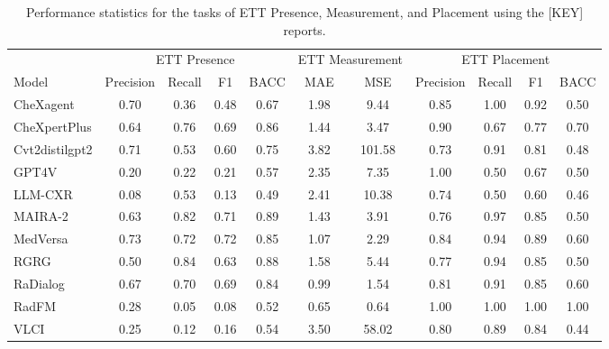 
    \begin{table*}[htbp]
        \centering
        \small
        \caption{Performance statistics for the tasks of ETT Presence, Measurement, and Placement using the [KEY] reports.}
        \begin{tabular}{lcccccccccc}
        \toprule
        & \multicolumn{4}{c}{ETT Presence} & \multicolumn{2}{c}{ETT Measurement} & \multicolumn{4}{c}{ETT Placement} \\
        \cmidrule(lr){2-5}\cmidrule(lr){6-7}\cmidrule(lr){8-11}
        Model & Precision & Recall & F1 & BACC & MAE & MSE & Precision & Recall & F1 & BACC \\
        \midrule
    CheXagent & 0.70 & 0.36 & 0.48 & 0.67 & 1.98 & 9.44 & 0.85 & 1.00 & 0.92 & 0.50 \\
CheXpertPlus & 0.64 & 0.76 & 0.69 & 0.86 & 1.44 & 3.47 & 0.90 & 0.67 & 0.77 & 0.70 \\
Cvt2distilgpt2 & 0.71 & 0.53 & 0.60 & 0.75 & 3.82 & 101.58 & 0.73 & 0.91 & 0.81 & 0.48 \\
GPT4V & 0.20 & 0.22 & 0.21 & 0.57 & 2.35 & 7.35 & 1.00 & 0.50 & 0.67 & 0.50 \\
LLM-CXR & 0.08 & 0.53 & 0.13 & 0.49 & 2.41 & 10.38 & 0.74 & 0.50 & 0.60 & 0.46 \\
MAIRA-2 & 0.63 & 0.82 & 0.71 & 0.89 & 1.43 & 3.91 & 0.76 & 0.97 & 0.85 & 0.50 \\
MedVersa & 0.73 & 0.72 & 0.72 & 0.85 & 1.07 & 2.29 & 0.84 & 0.94 & 0.89 & 0.60 \\
RGRG & 0.50 & 0.84 & 0.63 & 0.88 & 1.58 & 5.44 & 0.77 & 0.94 & 0.85 & 0.50 \\
RaDialog & 0.67 & 0.70 & 0.69 & 0.84 & 0.99 & 1.54 & 0.81 & 0.91 & 0.85 & 0.60 \\
RadFM & 0.28 & 0.05 & 0.08 & 0.52 & 0.65 & 0.64 & 1.00 & 1.00 & 1.00 & 1.00 \\
VLCI & 0.25 & 0.12 & 0.16 & 0.54 & 3.50 & 58.02 & 0.80 & 0.89 & 0.84 & 0.44 \\

        \bottomrule
        \end{tabular}
        \label{tab:ett_metrics_KEY}
    \end{table*}
    